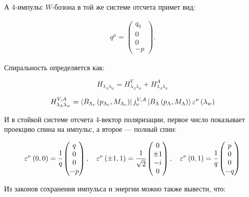 А 4-импульс $W$-бозона в той же системе отсчета примет вид:
 
\begin{gather}
    q^\mu = 
    \begin{pmatrix}
        q_0 \\ 0 \\ 0 \\ -p
    \end{pmatrix}.
\end{gather}
 
Спиральность определяется как:
 
\begin{equation}
    H_{\lambda_\Lambda \lambda_w} = H^V_{\lambda_\Lambda \lambda_w} 
    + H^A_{\lambda_\Lambda \lambda_w} 
\end{equation}
 
\begin{equation}
    H^{V,A}_{\lambda_\Lambda \lambda_w} = 
    \bra{B_{\Lambda_c} \left( p_{\Lambda_c}, M_{\Lambda_c} \right)}
    j_\nu^{V,A}
    \ket{B_{\Lambda} \left( p_{\Lambda}, M_{\Lambda} \right)} 
    \varepsilon^\nu \left( \lambda_w \right)
    \label{eq:helisity}
\end{equation}
 
И в стойкой системе отсчета 4-вектор поляризации, первое число показывает 
проекцию спина на импульс, а второе --- полный спин:
 
\begin{gather}
    \varepsilon^\nu\left( 0, 0 \right) = \cfrac{1}{q} 
    \begin{pmatrix}
        q \\ 0 \\ 0 \\ -p
    \end{pmatrix},
    \quad
    \varepsilon^\nu\left( \pm 1, 1 \right) = \cfrac{1}{\sqrt{2}} 
    \begin{pmatrix}
        0 \\ \pm 1 \\ -i \\ 0
    \end{pmatrix},
    \quad
    \varepsilon^\nu\left( 0, 1 \right) = \cfrac{1}{q} 
    \begin{pmatrix}
        p \\ 0 \\ 0 \\ -q
    \end{pmatrix}
    \label{eq:pol}
\end{gather}
 
Из законов сохранения импульса и энергии можно также вывести, что:
 

